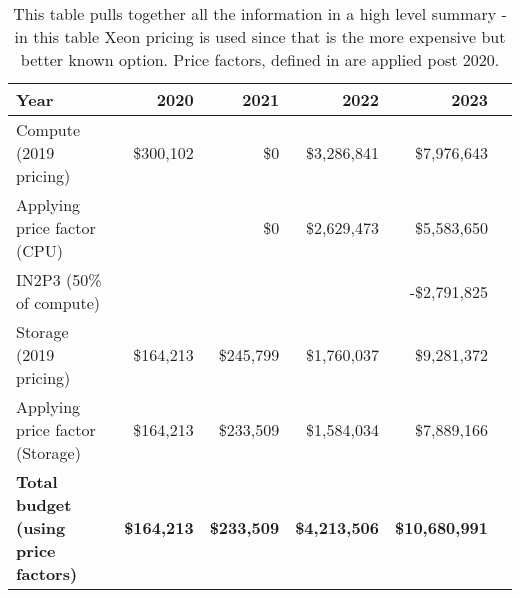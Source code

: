 \tiny \begin{longtable} { |p{}  |r  |r  |r  |r  |r |}
\caption{This table pulls together all the information in a high level summary - in this table Xeon pricing is used since that is the more expensive but better known option. Price factors, defined in  are applied post 2020.
 \label{tab:Summary}}\\
\hline
\textbf{Year}&\textbf{2020}&\textbf{2021}&\textbf{2022}&\textbf{2023} \\ \hline
{Compute (2019 pricing)}&{\$300,102}&{\$0}&{\$3,286,841}&{\$7,976,643} \\ \hline
{Applying price factor (CPU)}&{}&{\$0}&{\$2,629,473}&{\$5,583,650} \\ \hline
{IN2P3 (50\% of compute)}&{}&{}&{}&{-\$2,791,825} \\ \hline
{Storage (2019 pricing)}&{\$164,213}&{\$245,799}&{\$1,760,037}&{\$9,281,372} \\ \hline
{Applying price factor (Storage)}&{\$164,213}&{\$233,509}&{\$1,584,034}&{\$7,889,166} \\ \hline
\textbf{Total budget (using price factors)}&\textbf{\$164,213}&\textbf{\$233,509}&\textbf{\$4,213,506}&\textbf{\$10,680,991} \\ \hline
\end{longtable} \normalsize
